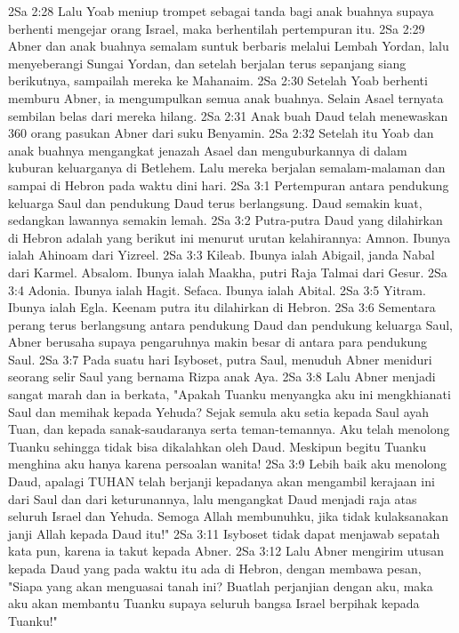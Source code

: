 2Sa 2:28  Lalu Yoab meniup trompet sebagai tanda bagi anak buahnya supaya berhenti mengejar orang Israel, maka berhentilah pertempuran itu.
2Sa 2:29  Abner dan anak buahnya semalam suntuk berbaris melalui Lembah Yordan, lalu menyeberangi Sungai Yordan, dan setelah berjalan terus sepanjang siang berikutnya, sampailah mereka ke Mahanaim.
2Sa 2:30  Setelah Yoab berhenti memburu Abner, ia mengumpulkan semua anak buahnya. Selain Asael ternyata sembilan belas dari mereka hilang.
2Sa 2:31  Anak buah Daud telah menewaskan 360 orang pasukan Abner dari suku Benyamin.
2Sa 2:32  Setelah itu Yoab dan anak buahnya mengangkat jenazah Asael dan menguburkannya di dalam kuburan keluarganya di Betlehem. Lalu mereka berjalan semalam-malaman dan sampai di Hebron pada waktu dini hari.
2Sa 3:1  Pertempuran antara pendukung keluarga Saul dan pendukung Daud terus berlangsung. Daud semakin kuat, sedangkan lawannya semakin lemah.
2Sa 3:2  Putra-putra Daud yang dilahirkan di Hebron adalah yang berikut ini menurut urutan kelahirannya: Amnon. Ibunya ialah Ahinoam dari Yizreel.
2Sa 3:3  Kileab. Ibunya ialah Abigail, janda Nabal dari Karmel. Absalom. Ibunya ialah Maakha, putri Raja Talmai dari Gesur.
2Sa 3:4  Adonia. Ibunya ialah Hagit. Sefaca. Ibunya ialah Abital.
2Sa 3:5  Yitram. Ibunya ialah Egla. Keenam putra itu dilahirkan di Hebron.
2Sa 3:6  Sementara perang terus berlangsung antara pendukung Daud dan pendukung keluarga Saul, Abner berusaha supaya pengaruhnya makin besar di antara para pendukung Saul.
2Sa 3:7  Pada suatu hari Isyboset, putra Saul, menuduh Abner meniduri seorang selir Saul yang bernama Rizpa anak Aya.
2Sa 3:8  Lalu Abner menjadi sangat marah dan ia berkata, "Apakah Tuanku menyangka aku ini mengkhianati Saul dan memihak kepada Yehuda? Sejak semula aku setia kepada Saul ayah Tuan, dan kepada sanak-saudaranya serta teman-temannya. Aku telah menolong Tuanku sehingga tidak bisa dikalahkan oleh Daud. Meskipun begitu Tuanku menghina aku hanya karena persoalan wanita!
2Sa 3:9  Lebih baik aku menolong Daud, apalagi TUHAN telah berjanji kepadanya akan mengambil kerajaan ini dari Saul dan dari keturunannya, lalu mengangkat Daud menjadi raja atas seluruh Israel dan Yehuda. Semoga Allah membunuhku, jika tidak kulaksanakan janji Allah kepada Daud itu!"
2Sa 3:11  Isyboset tidak dapat menjawab sepatah kata pun, karena ia takut kepada Abner.
2Sa 3:12  Lalu Abner mengirim utusan kepada Daud yang pada waktu itu ada di Hebron, dengan membawa pesan, "Siapa yang akan menguasai tanah ini? Buatlah perjanjian dengan aku, maka aku akan membantu Tuanku supaya seluruh bangsa Israel berpihak kepada Tuanku!"
